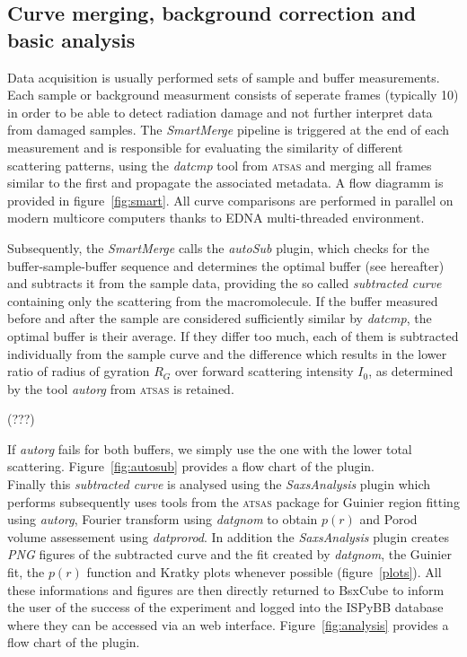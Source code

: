 \documentclass[preprint,pdf]{iucr}              %
\begin{document}
\subsection{Curve merging, background correction and basic analysis}
\label{SM}
Data acquisition is usually performed sets of sample and buffer measurements.
Each sample or background measurment consists of seperate frames (typically 10)
in order to be able to detect radiation damage and not further interpret data from damaged samples.
The \textit{SmartMerge} pipeline is triggered at the end of each measurement
and is responsible for evaluating the similarity of different scattering
patterns, using the \textit{datcmp} tool from \textsc{atsas} and merging all frames
similar to the first and propagate the associated metadata.
A flow diagramm is provided in figure~\ref{fig:smart}.
All curve comparisons are performed in parallel on modern multicore
computers thanks to EDNA multi-threaded environment.

Subsequently, the \textit{SmartMerge} calls the \textit{autoSub} plugin, which
checks for the buffer-sample-buffer sequence and determines the optimal buffer
(see hereafter) and subtracts it from the sample data,  providing the so called
\textit{subtracted curve} containing only the scattering from the macromolecule.
If the buffer measured before and after the sample are considered sufficiently
similar by \textit{datcmp}, the optimal buffer is their average.
If they differ too much, each of them is subtracted individually from the
sample curve and the difference which results in the lower ratio of radius
of gyration $R_{G}$ over forward scattering intensity $I_{0}$, as determined by
the tool \textit{autorg} from \textsc{atsas} is retained.

(???)

If \textit{autorg} fails for both buffers, we simply use the one with the lower
total scattering. Figure~\ref{fig:autosub} provides a flow chart of the plugin.\\

Finally this \textit{subtracted curve} is analysed using the
\textit{SaxsAnalysis} plugin which performs subsequently uses tools from the \textsc{atsas} package for Guinier region fitting
using \textit{autorg}, Fourier transform using \textit{datgnom} to obtain
$p(r)$ and Porod volume assessement using \textit{datprorod}.
In addition the \textit{SaxsAnalysis} plugin creates \textit{PNG} figures of
the subtracted curve and the fit created by \textit{datgnom}, the Guinier fit, the $p(r)$ function and Kratky plots whenever possible (figure~\ref{plots}).
All these informations and figures are then directly returned to BsxCube to inform the user
of the success of the experiment and logged into the ISPyBB
database \cite{ispybb} where they can be accessed via an web interface.
Figure~\ref{fig:analysis} provides a flow chart of the plugin.
\end{document}
